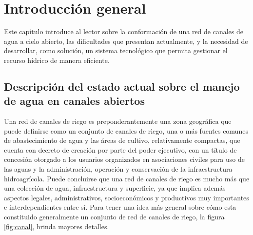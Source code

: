 
\chapter{Introducción general} %

\label{Chapter1} %
\label{IntroGeneral}

Este capítulo introduce al lector sobre la conformación de una red de canales de agua a cielo abierto, las dificultades que presentan actualmente, y la necesidad de desarrollar, como solución, un sistema tecnológico que permita gestionar el recurso hídrico de manera eficiente. 

\newcommand{\keyword}[1]{\textbf{#1}}
\newcommand{\tabhead}[1]{\textbf{#1}}
\newcommand{\code}[1]{\texttt{#1}}
\newcommand{\file}[1]{\texttt{\bfseries#1}}
\newcommand{\option}[1]{\texttt{\itshape#1}}
\newcommand{\grados}{$^{\circ}$}



\section{Descripción del estado actual sobre el manejo de agua en canales abiertos}

Una red de canales de riego es preponderantemente una zona geográfica que puede definirse como un conjunto de canales de riego, una o más fuentes comunes de abastecimiento de agua y las áreas de cultivo, relativamente compactas, que cuenta con decreto de creación por parte del poder ejecutivo, con un título de concesión otorgado a los usuarios organizados en asociaciones civiles para uso de las aguas y la administración, operación y conservación de la infraestructura hidroagrícola.
Puede concluirse que una red de canales de riego es mucho más que una colección de agua, infraestructura y superficie, ya que implica además aspectos legales, administrativos, socioeconómicos y productivos muy importantes e interdependientes entre sí.
Para tener una idea más general sobre cómo esta constituido generalmente un conjunto de red de canales de riego, la figura \ref{fig:canal}, brinda mayores detalles.

